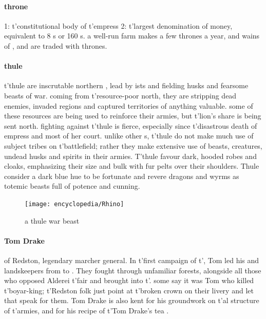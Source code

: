 \paragraph{throne} 1: t'\allowbreak constitutional body of t'\allowbreak empress 2: t'\allowbreak largest denomination of money, equivalent to 8 s or 160 s. a well-run farm makes a few thrones a year, and wains of ,  and  are traded with thrones. 
\paragraph{thule} t'\allowbreak thule are inscrutable northern , lead by ists and fielding husks and fearsome beasts of war. coming from t'\allowbreak resource-poor north, they are stripping dead enemies, invaded regions and captured territories of anything valuable. some of these resources are being used to reinforce their armies, but t'\allowbreak lion's share is being sent north. fighting against t'\allowbreak thule is fierce, especially since t'\allowbreak disastrous death of empress  and most of her court. unlike other s, t'\allowbreak thule do not make much use of subject tribes on t'\allowbreak battlefield; rather they make extensive use of beasts, creatures, undead husks and spirits in their armies. T'thule favour dark, hooded robes and cloaks, emphasizing their size and bulk with fur pelts over their shoulders. Thule consider a dark blue hue to be fortunate and revere dragons and wyrms as totemic beasts full of potence and cunning.\begin{figure}\centering\texttt{[image: encyclopedia/Rhino]}\caption{a thule war beast}\end{figure}
\paragraph{Tom Drake} of Redston, legendary marcher general. In t'\allowbreak first campaign of t'\allowbreak {}, Tom led his  and landskeepers from  to . They fought through unfamiliar forests, alongside all those who opposed Alderei t'\allowbreak fair and brought  into t'\allowbreak {}. some say it was Tom who killed t'\allowbreak boyar-king; t'\allowbreak Redston folk just point at t'\allowbreak broken crown on their livery and let that speak for them. Tom Drake is also kent for his groundwork on t'\allowbreak {}al structure of t'\allowbreak armies, and for his recipe of t'\allowbreak Tom Drake's tea .
